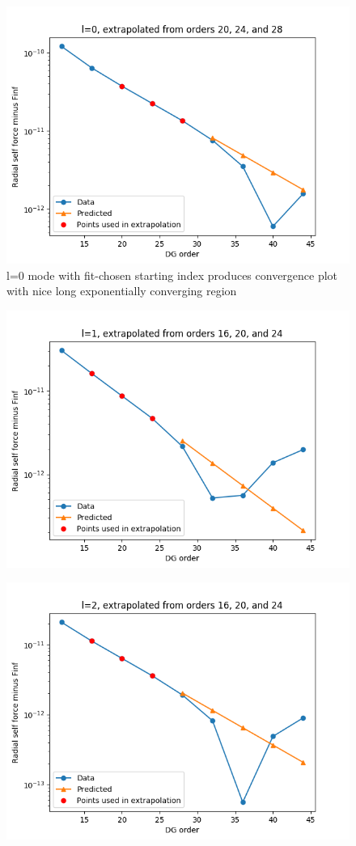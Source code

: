 \documentclass{article}
\begin{document}
\begin{figure}
  \includegraphics{fittingtechniqet370l0}
  \caption{l=0 mode with fit-chosen starting index produces convergence plot with nice long exponentially converging region}
\end{figure}
\begin{figure}
\includegraphics{fittingtechniquet370l1}
\end{figure}
\begin{figure}
\includegraphics{fittingtechniquet370l2}
\end{figure}
\end{document}
